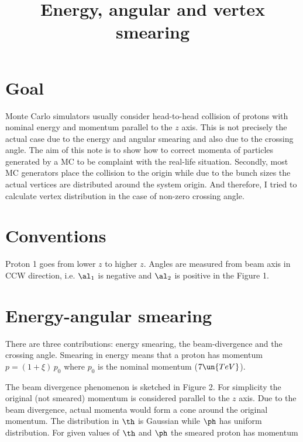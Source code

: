 



\Reftrue




\BeginText

\title{Energy, angular and vertex smearing}

\section{Goal}
Monte Carlo simulators usually consider head-to-head collision of protons with nominal energy and momentum parallel to the $z$ axis. This is not precisely the actual case due to the energy and angular smearing and also due to the crossing angle. The aim of this note is to show how to correct momenta of particles generated by a MC to be complaint with the real-life situation. Secondly, most MC generators place the collision to the origin while due to the bunch sizes the actual vertices are distributed around the system origin. And therefore, I tried to calculate vertex distribution in the case of non-zero crossing angle.

\section{Conventions}

Proton 1 goes from lower $z$ to higher $z$. Angles are measured from beam axis in CCW direction, i.e. $\al_1$ is negative and $\al_2$ is positive in the Figure 1.


\section{Energy-angular smearing}
There are three contributions: energy smearing, the beam-divergence and the crossing angle. Smearing in energy means that a proton has momentum $p = (1 + \xi)\, p_0$ where $p_0$ is the nominal momentum ($7\un{TeV}$).


The beam divergence phenomenon is sketched in Figure 2. For simplicity the original (not smeared) momentum is considered parallel to the $z$ axis. Due to the beam divergence, actual momenta would form a cone around the original momentum. The distribution in $\th$ is Gaussian while $\ph$ has uniform distribution. For given values of $\th$ and $\ph$ the smeared proton has momentum

